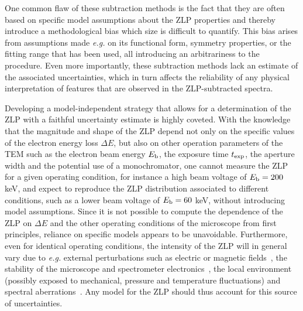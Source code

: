 One common flaw of these subtraction methods is the fact that they are often based on specific
model assumptions about the ZLP properties and thereby introduce a methodological
bias which size is difficult to quantify. 
%
This bias arises from assumptions made {\it e.g.} on its functional form, symmetry 
properties, or the fitting range that has been used, all introducing an arbitrariness
to the procedure.
%
Even more importantly, these subtraction methods lack an estimate of the associated uncertainties, 
which in turn affects the reliability of any physical interpretation of features that are observed
in the ZLP-subtracted spectra. 

Developing a model-independent strategy that allows for a determination of the ZLP
with a faithful uncertainty estimate is highly coveted.
%
With the knowledge that the magnitude and shape of the ZLP depend
not only on the specific values
of the electron energy loss $\Delta E$, but also on other operation parameters
of the TEM such as the electron beam energy $E_{\rm b}$, the exposure time
$t_{\rm exp}$, the aperture width and the potential use of a monochromator,
one cannot measure the ZLP for a given operating
condition, for instance a high beam voltage of $E_{\rm b}=200$ keV, and expect to reproduce
the ZLP distribution
associated to different conditions, such as a lower beam voltage of $E_{\rm b}=60$ keV,
without introducing model assumptions.
%
Since it is not possible to compute the dependence of the ZLP on $\Delta E$
and the other operating conditions of the microscope from first principles,
reliance on specific models appears to be unavoidable.
%
Furthermore, even for identical operating conditions, 
the intensity of the ZLP will in general vary due to {\it e.g.} external perturbations 
such as electric or magnetic fields~\cite{Rafferty:2000},
the stability of the microscope and spectrometer electronics~\cite{Kothleitner:2003}, 
the local environment (possibly exposed to mechanical, pressure and temperature fluctuations) 
and spectral aberrations~\cite{Egerton:1996}. 
%
Any model for the ZLP should thus account for this source of uncertainties.

